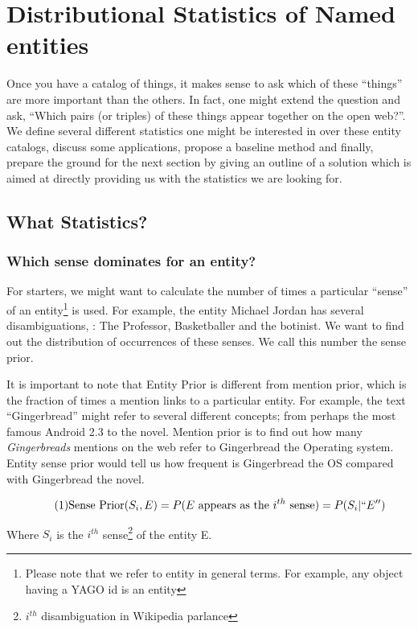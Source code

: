 \section{Distributional Statistics of Named entities}
\label{secagg}
Once you have a catalog of things, it makes sense to ask which of these ``things'' are more important than the others.
In fact, one might extend the question and ask, ``Which pairs (or triples) of these things appear together on the open web?''.
We define several different statistics one might be interested in over these entity catalogs, discuss some applications, 
propose a baseline method and finally, prepare the ground for the next section by giving an outline of a solution 
which is aimed at directly providing us with the statistics we are looking for. 

\subsection{What Statistics?}

\subsubsection{Which sense dominates for an entity?}
For starters, we might want to calculate the number of times a particular ``sense'' of an entity\footnote{Please note that we 
refer to entity in general terms. For example, any object having a YAGO id is an entity} is used. 
For example, the entity Michael Jordan has several disambiguations,  : The Professor, Basketballer and the botinist. 
We want to find out the distribution of occurrences of these senses. We call this number the sense prior.

It is important to note that Entity Prior is different from mention prior, which is the fraction of times a mention 
links to a particular entity. For example, the text ``Gingerbread'' might refer to several different concepts; from perhaps the most famous Android 2.3 to the novel.
Mention prior is to find out how many \emph{Gingerbreads} mentions on the web refer to Gingerbread the Operating system.
Entity sense prior would tell us how frequent is Gingerbread the OS compared with Gingerbread the novel.

\begin{equation}
\tag{1}
\text{Sense Prior}(S_i, E) =  P(E\text{ appears as the $i^{th}$ sense}) = P(S_i | ``E'')
\end{equation}

Where $S_i$ is the $i^{th}$ sense\footnote{$i^{th}$ disambiguation in Wikipedia parlance} of the entity E. 

